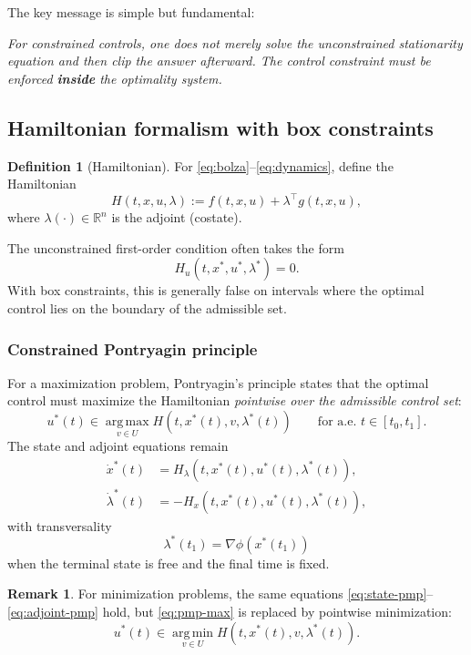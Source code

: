 \documentclass[11pt]{article}
\theoremstyle{definition}
\newtheorem{definition}{Definition}
\newtheorem{remark}{Remark}
\newcommand{\R}{\mathbb{R}}
\newcommand{\argmax}{\operatorname*{arg\,max}}
\newcommand{\argmin}{\operatorname*{arg\,min}}
\begin{document}
\medskip

The key message is simple but fundamental:

\begin{center}
\emph{For constrained controls, one does not merely solve the unconstrained stationarity equation and then clip the answer afterward. The control constraint must be enforced \textbf{inside} the optimality system.}
\end{center}

\subsection{Hamiltonian formalism with box constraints}

\begin{definition}[Hamiltonian]
For \eqref{eq:bolza}--\eqref{eq:dynamics}, define the Hamiltonian
\[
H(t,x,u,\lambda) := f(t,x,u) + \lambda^\top g(t,x,u),
\]
where $\lambda(\cdot)\in \R^n$ is the adjoint (costate).
\end{definition}

The unconstrained first-order condition often takes the form
\[
H_u(t,x^*,u^*,\lambda^*) = 0.
\]
With box constraints, this is generally false on intervals where the optimal control lies on the boundary of the admissible set.

\subsubsection{Constrained Pontryagin principle}

For a maximization problem, Pontryagin's principle states that the optimal control must maximize the Hamiltonian \emph{pointwise over the admissible control set}:
\begin{equation}
\label{eq:pmp-max}
u^*(t)\in \argmax_{v\in U} H(t,x^*(t),v,\lambda^*(t))
\qquad \text{for a.e. } t\in[t_0,t_1].
\end{equation}
The state and adjoint equations remain
\begin{align}
\dot x^*(t) &= H_\lambda(t,x^*(t),u^*(t),\lambda^*(t)),
\label{eq:state-pmp}
\\
\dot \lambda^*(t) &= - H_x(t,x^*(t),u^*(t),\lambda^*(t)),
\label{eq:adjoint-pmp}
\end{align}
with transversality
\[
\lambda^*(t_1)=\nabla \phi(x^*(t_1))
\]
when the terminal state is free and the final time is fixed.

\begin{remark}
For minimization problems, the same equations \eqref{eq:state-pmp}--\eqref{eq:adjoint-pmp} hold, but \eqref{eq:pmp-max} is replaced by pointwise minimization:
\[
u^*(t)\in \argmin_{v\in U} H(t,x^*(t),v,\lambda^*(t)).
\]
\end{remark}
\end{document}
